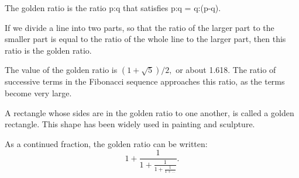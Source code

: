The golden ratio is the ratio p:q that satisfies p:q = q:(p-q). 
\par
If we divide a line into two parts, so that the ratio of the larger part
to the smaller part is equal to the ratio of the whole line to the larger part,
then this ratio is the golden ratio.
\par
The value of the golden ratio is $ (1 + \sqrt{5} ) / 2 , $ or about 1.618.
The ratio of successive terms in the Fibonacci sequence approaches
this ratio, as the terms become very large.
\par
A rectangle whose sides are in the golden ratio to one another, is called a
golden rectangle. This shape has been widely used in painting and sculpture.
\par
As a continued fraction, the golden ratio can be written: 
\[ 1 + \frac{1}{1 + \frac{1}{1 + \frac{1}{1 + ...}}} . \]